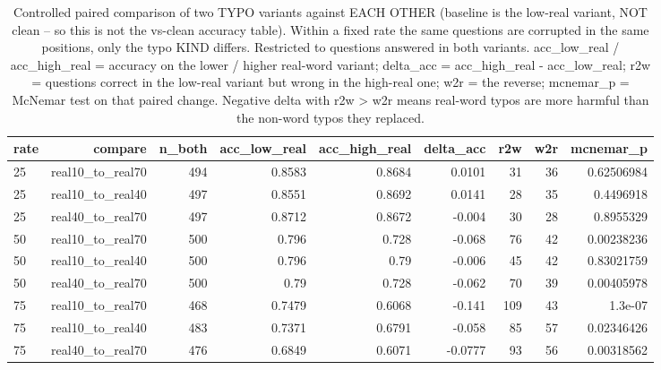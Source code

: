 \documentclass[11pt]{article}
\begin{document}
\begin{table}[H]
\centering
\caption{Controlled paired comparison of two TYPO variants against EACH OTHER (baseline is the low-real variant, NOT clean -- so this is not the vs-clean accuracy table). Within a fixed rate the same questions are corrupted in the same positions, only the typo KIND differs. Restricted to questions answered in both variants. acc\_low\_real / acc\_high\_real = accuracy on the lower / higher real-word variant; delta\_acc = acc\_high\_real - acc\_low\_real; r2w = questions correct in the low-real variant but wrong in the high-real one; w2r = the reverse; mcnemar\_p = McNemar test on that paired change. Negative delta with r2w > w2r means real-word typos are more harmful than the non-word typos they replaced.}
\small
\begin{adjustbox}{max width=\textwidth}
\begin{tabular}{lrrrrrrrr}
\toprule
\textbf{rate} & \textbf{compare} & \textbf{n\_both} & \textbf{acc\_low\_real} & \textbf{acc\_high\_real} & \textbf{delta\_acc} & \textbf{r2w} & \textbf{w2r} & \textbf{mcnemar\_p} \\
\midrule
25 & real10\_to\_real70 & 494 & 0.8583 & 0.8684 & 0.0101 & 31 & 36 & 0.62506984 \\
25 & real10\_to\_real40 & 497 & 0.8551 & 0.8692 & 0.0141 & 28 & 35 & 0.4496918 \\
25 & real40\_to\_real70 & 497 & 0.8712 & 0.8672 & -0.004 & 30 & 28 & 0.8955329 \\
50 & real10\_to\_real70 & 500 & 0.796 & 0.728 & -0.068 & 76 & 42 & 0.00238236 \\
50 & real10\_to\_real40 & 500 & 0.796 & 0.79 & -0.006 & 45 & 42 & 0.83021759 \\
50 & real40\_to\_real70 & 500 & 0.79 & 0.728 & -0.062 & 70 & 39 & 0.00405978 \\
75 & real10\_to\_real70 & 468 & 0.7479 & 0.6068 & -0.141 & 109 & 43 & 1.3e-07 \\
75 & real10\_to\_real40 & 483 & 0.7371 & 0.6791 & -0.058 & 85 & 57 & 0.02346426 \\
75 & real40\_to\_real70 & 476 & 0.6849 & 0.6071 & -0.0777 & 93 & 56 & 0.00318562 \\
\bottomrule
\end{tabular}
\end{adjustbox}
\end{table}
\end{document}
